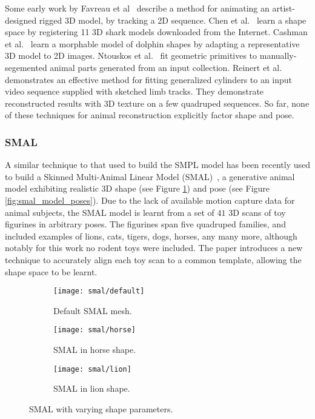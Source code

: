 Some early work by Favreau et al~\cite{xxx} describe a method for animating an artist-designed rigged 3D model, by tracking a 2D sequence. Chen et al.~\cite{xxx} learn a shape space by registering 11 3D shark models downloaded from the Internet. Cashman et al.~\cite{xxx} learn a morphable model of dolphin shapes by adapting a representative 3D model to 2D images. Ntouskos et al.~\cite{xxx} fit geometric primitives to manually-segemented animal parts generated from an input collection. Reinert et al.~\cite{xxx} demonstrates an effective method for fitting generalized cylinders to an input video sequence supplied with sketched limb tracks. They demonstrate reconstructed results with 3D texture on a few quadruped sequences. So far, none of these techniques for animal reconstruction explicitly factor shape and pose.

\subsubsection{SMAL}
A similar technique to that used to build the SMPL model has been recently used to build a Skinned Multi-Animal Linear Model (SMAL)~\cite{zuffi2017menagerie}, a generative animal model exhibiting realistic 3D shape (see Figure \ref{fig:smal_model_shape}) and pose (see Figure \ref{fig:smal_model_poses}). Due to the lack of available motion capture data for animal subjects, the SMAL model is learnt from a set of $41$ 3D scans of toy figurines in arbitrary poses. The figurines span five quadruped families, and included examples of lions, cats, tigers, dogs, horses, any many more, although notably for this work no rodent toys were included. The paper introduces a new technique to accurately align each toy scan to a common template, allowing the shape space to be learnt.

\begin{figure}[t]
    \centering
    \begin{subfigure}{0.3\linewidth}
    \centering
        \texttt{[image: smal/default]}
        \caption{Default SMAL mesh.}
    \end{subfigure}%
    \begin{subfigure}{0.3\linewidth}
    \centering
        \texttt{[image: smal/horse]}
        \caption{SMAL in horse shape.}
    \end{subfigure}%
    \begin{subfigure}{0.3\linewidth}
        \centering
            \texttt{[image: smal/lion]}
            \caption{SMAL in lion shape.}
    \end{subfigure}%
    \caption{SMAL with varying shape parameters.}
    \label{fig:smal_model_shape}
    \end{figure}

